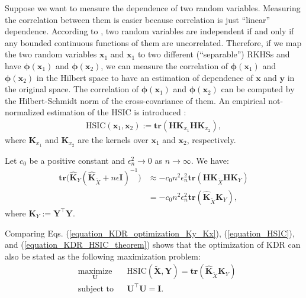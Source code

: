 \documentclass[lang=cn,10pt]{gorgeousnbook}
\numberwithin{equation}{section}%
\numberwithin{figure}{section}%
\begin{document}
Suppose we want to measure the dependence of two random variables. Measuring the correlation between them is easier because correlation is just ``linear'' dependence. 
According to \cite{hein2004kernels}, two random variables are independent if and only if any bounded continuous functions of them are uncorrelated. Therefore, if we map the two random variables $\boldsymbol{x}_1$ and $\boldsymbol{x}_1$ to two different (``separable'') RKHSs and have $\boldsymbol{\phi}(\boldsymbol{x}_1)$ and $\boldsymbol{\phi}(\boldsymbol{x}_2)$, we can measure the correlation of $\boldsymbol{\phi}(\boldsymbol{x}_1)$ and $\boldsymbol{\phi}(\boldsymbol{x}_2)$ in the Hilbert space to have an estimation of dependence of $\boldsymbol{x}$ and $\boldsymbol{y}$ in the original space. 
The correlation of $\boldsymbol{\phi}(\boldsymbol{x}_1)$ and $\boldsymbol{\phi}(\boldsymbol{x}_2)$ can be computed by the Hilbert-Schmidt norm of the cross-covariance of them. 
An empirical not-normalized estimation of the HSIC is introduced \cite{gretton2005measuring}:
\begin{align}\label{equation_HSIC}
\text{HSIC}(\boldsymbol{x}_1, \boldsymbol{x}_2) := \textbf{tr}(\boldsymbol{H}\boldsymbol{K}_{x_1}\boldsymbol{H}\boldsymbol{K}_{x_2}),
\end{align}
where $\boldsymbol{K}_{x_1}$ and $\boldsymbol{K}_{x_2}$ are the kernels over $\boldsymbol{x}_1$ and $\boldsymbol{x}_2$, respectively.

\begin{theorem}[]
Let $c_0$ be a positive constant and $\epsilon_n^2 \rightarrow 0$ as $n \rightarrow \infty$. 
We have:
\begin{align}
\textbf{tr}\big(\widehat{\boldsymbol{K}}_Y (\widehat{\boldsymbol{K}}_{\widetilde{X}} + n\epsilon \boldsymbol{I})^{-1}\big) &\approx - c_0 n^2 \epsilon_n^2 \textbf{tr}(\boldsymbol{H}\boldsymbol{K}_{\widetilde{X}}\boldsymbol{H}\boldsymbol{K}_{Y}) \nonumber\\
&= - c_0 n^2 \epsilon_n^2 \textbf{tr}(\widehat{\boldsymbol{K}}_{\widetilde{X}}\boldsymbol{K}_{Y}), \label{equation_KDR_HSIC_theorem}
\end{align}
where $\boldsymbol{K}_{Y} := \boldsymbol{Y}^\top \boldsymbol{Y}$.
\end{theorem}
Comparing Eqs. (\ref{equation_KDR_optimization_Ky_Kx}), (\ref{equation_HSIC}), and (\ref{equation_KDR_HSIC_theorem}) shows that the optimization of KDR can also be stated as the following maximization problem:
\begin{equation}\label{equation_KDR_optimization_HSIC}
\begin{aligned}
& \underset{\boldsymbol{U}}{\text{maximize}} 
& & \text{HSIC}(\widetilde{\boldsymbol{X}}, \boldsymbol{Y}) = \textbf{tr}(\widehat{\boldsymbol{K}}_{\widetilde{X}}\boldsymbol{K}_{Y}) \\
& \text{subject to}
& & \boldsymbol{U}^\top \boldsymbol{U} = \boldsymbol{I}.
\end{aligned}
\end{equation}
\end{document}
